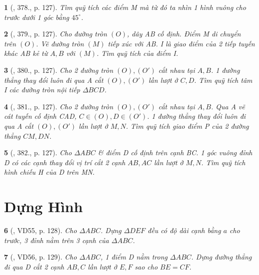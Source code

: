 \documentclass{article}
\newtheorem{baitoan}{}
\begin{document}
\begin{baitoan}[\cite{Binh_Toan_9_tap_2}, 378., p. 127]
	Tìm quỹ tích các điểm M mà từ đó ta nhìn 1 hình vuông cho trước dưới 1 góc bằng $45^\circ$.
\end{baitoan}

\begin{baitoan}[\cite{Binh_Toan_9_tap_2}, 379., p. 127]
	Cho đường tròn $(O)$, dây AB cố định. Điểm M di chuyển trên $(O)$. Vẽ đường tròn $(M)$ tiếp xúc với AB. I là giao điểm của 2 tiếp tuyến khác AB kẻ từ $A,B$ với $(M)$. Tìm quỹ tích của điểm I.
\end{baitoan}

\begin{baitoan}[\cite{Binh_Toan_9_tap_2}, 380., p. 127]
	Cho 2 đường tròn $(O),(O')$ cắt nhau tại $A,B$. 1 đường thẳng thay đổi luôn đi qua A cắt $(O),(O')$ lần lượt ở $C,D$. Tìm quỹ tích tâm I các đường tròn nội tiếp $\Delta BCD$.
\end{baitoan}

\begin{baitoan}[\cite{Binh_Toan_9_tap_2}, 381., p. 127]
	Cho 2 đường tròn $(O),(O')$ cắt nhau tại $A,B$. Qua A vẽ cát tuyến cố định CAD, $C\in(O),D\in(O')$. 1 đường thẳng thay đổi luôn đi qua A cắt $(O),(O')$ lần lượt ở $M,N$. Tìm quỹ tích giao điểm P của 2 đường thẳng $CM,DN$.
\end{baitoan}

\begin{baitoan}[\cite{Binh_Toan_9_tap_2}, 382., p. 127]
	Cho $\Delta ABC$ \& điểm D cố định trên cạnh BC. 1 góc vuông đỉnh D có các cạnh thay đổi vị trí cắt 2 cạnh $AB,AC$ lần lượt ở $M,N$. Tìm quỹ tích hình chiếu H của D trên MN.
\end{baitoan}


\section{Dựng Hình}

\begin{baitoan}[\cite{Binh_Toan_9_tap_2}, VD55, p. 128]
	Cho $\Delta ABC$. Dựng $\Delta DEF$ đều có độ dài cạnh bằng $a$ cho trước, 3 đỉnh nằm trên 3 cạnh của $\Delta ABC$.
\end{baitoan}

\begin{baitoan}[\cite{Binh_Toan_9_tap_2}, VD56, p. 129]
	Cho $\Delta ABC$, 1 điểm D nằm trong $\Delta ABC$. Dựng đường thẳng đi qua D cắt 2 cạnh $AB,C$ lần lượt ở $E,F$ sao cho $BE = CF$.
\end{baitoan}
\end{document}
